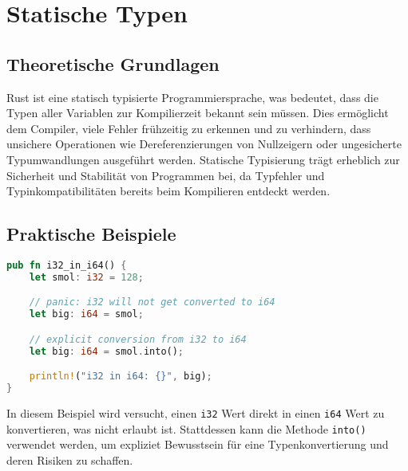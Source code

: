
\chapter{Statische Typen}

\section{Theoretische Grundlagen}

Rust ist eine statisch typisierte Programmiersprache, was bedeutet, dass die Typen aller Variablen zur Kompilierzeit bekannt sein müssen. 
Dies ermöglicht dem Compiler, viele Fehler frühzeitig zu erkennen und zu verhindern, dass unsichere Operationen wie Dereferenzierungen von Nullzeigern oder ungesicherte Typumwandlungen ausgeführt werden. 
Statische Typisierung trägt erheblich zur Sicherheit und Stabilität von Programmen bei, da Typfehler und Typinkompatibilitäten bereits beim Kompilieren entdeckt werden.

\section{Praktische Beispiele}

\begin{lstlisting}[language=Rust, caption={i32 in i64}]
pub fn i32_in_i64() {
    let smol: i32 = 128;

    // panic: i32 will not get converted to i64
    let big: i64 = smol;

    // explicit conversion from i32 to i64 
    let big: i64 = smol.into();

    println!("i32 in i64: {}", big);
}
\end{lstlisting}

\noindent
In diesem Beispiel wird versucht, einen \texttt{i32} Wert direkt in einen \texttt{i64} Wert zu konvertieren, was nicht erlaubt ist. 
Stattdessen kann die Methode \texttt{into()} verwendet werden, um expliziet Bewusstsein für eine Typenkonvertierung und deren Risiken zu schaffen.


